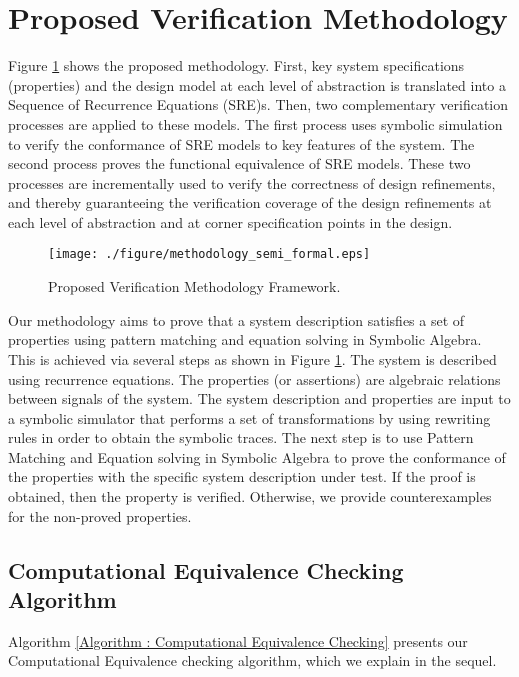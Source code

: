 \documentclass[submission,copyright,creativecommons]{eptcs}
\begin{document}
\section{Proposed Verification Methodology}
Figure \ref{Figure: Proposed Verification Methodology Framework000} shows the proposed methodology. First, key system specifications (properties) and the design model at each level of abstraction  is translated into a Sequence of Recurrence Equations (SRE)s. Then, two complementary verification processes are applied to these models. The first process uses symbolic simulation to verify the conformance of SRE models to key features of the system. The second process proves the functional equivalence of SRE models. These two processes are incrementally used to verify the correctness of design refinements, and thereby guaranteeing the verification coverage of the design refinements at each level of abstraction and at corner specification points in the design.
\begin{figure}[!htb]
\centering
\texttt{[image: ./figure/methodology\_semi\_formal.eps]}
\caption{\small{Proposed Verification Methodology Framework.}}
\label{Figure: Proposed Verification Methodology Framework000}
\end{figure}

Our methodology aims to prove that a system description satisfies a set of properties using pattern matching and equation solving in Symbolic Algebra. This is achieved via several steps as shown in Figure \ref{Figure: Proposed Verification Methodology Framework000}. The system is described using recurrence equations. The properties (or assertions) are algebraic relations between signals of the system. The system description and properties are input to a symbolic simulator that performs a set of transformations by using rewriting rules in order to obtain the symbolic traces. The next step is to use Pattern Matching and Equation solving in Symbolic Algebra to prove the conformance of the properties with the specific system description under test. If the proof is obtained, then the property is verified. Otherwise, we provide counterexamples for the non-proved properties.


\subsection{Computational Equivalence Checking Algorithm}
Algorithm \ref{Algorithm : Computational Equivalence Checking} presents our Computational Equivalence checking algorithm, which we explain in the sequel.
\end{document}

